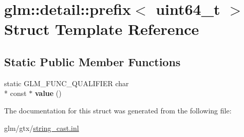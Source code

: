 \hypertarget{structglm_1_1detail_1_1prefix_3_01uint64__t_01_4}{\section{glm\-:\-:detail\-:\-:prefix$<$ uint64\-\_\-t $>$ Struct Template Reference}
\label{structglm_1_1detail_1_1prefix_3_01uint64__t_01_4}
}
\subsection*{Static Public Member Functions}
\begin{DoxyCompactItemize}
\item 
\hypertarget{structglm_1_1detail_1_1prefix_3_01uint64__t_01_4_a70571c67b5d9aadad2b0d3ea937fa392}{static G\-L\-M\-\_\-\-F\-U\-N\-C\-\_\-\-Q\-U\-A\-L\-I\-F\-I\-E\-R char \\*
const $\ast$ {\bfseries value} ()}\label{structglm_1_1detail_1_1prefix_3_01uint64__t_01_4_a70571c67b5d9aadad2b0d3ea937fa392}

\end{DoxyCompactItemize}


The documentation for this struct was generated from the following file\-:\begin{DoxyCompactItemize}
\item 
glm/gtx/\hyperlink{string__cast_8inl}{string\-\_\-cast.\-inl}\end{DoxyCompactItemize}
